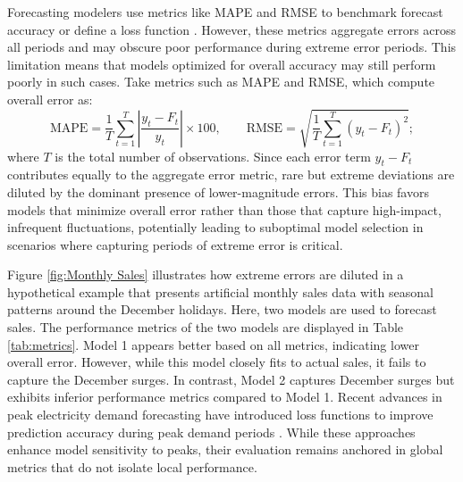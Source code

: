 \documentclass[12pt]{article}
\begin{document}
Forecasting modelers use metrics like MAPE and RMSE to benchmark forecast accuracy or define a loss function \citep{petropoulos2022}. However, these metrics aggregate errors across all periods and may obscure poor performance during extreme error periods. This limitation means that models optimized for overall accuracy may still perform poorly in such cases. Take metrics such as MAPE and RMSE, which compute overall error as:
\begin{equation}
\text{MAPE} = \frac{1}{T} \sum_{t=1}^{T} \left| \frac{y_t - F_t}{y_t} \right| \times 100,
\qquad
\text{RMSE} = \sqrt{\frac{1}{T} \sum_{t=1}^{T} (y_t - F_t)^2};
\end{equation}
where $T$ is the total number of observations. Since each error term $y_t - F_t$ contributes equally to the aggregate error metric, rare but extreme deviations are diluted by the dominant presence of lower-magnitude errors. This bias favors models that minimize overall error rather than those that capture high-impact, infrequent fluctuations, potentially leading to suboptimal model selection in scenarios where capturing periods of extreme error is critical.

Figure \ref{fig:Monthly Sales} illustrates how extreme errors are diluted in a hypothetical example that presents artificial monthly sales data with seasonal patterns around the December holidays. Here, two models are used to forecast sales. The performance metrics of the two models are displayed in Table \ref{tab:metrics}. Model 1 appears better based on all metrics, indicating lower overall error. However, while this model closely fits to actual sales, it fails to capture the December surges. In contrast, Model 2 captures  December surges but exhibits inferior performance metrics compared to Model 1.  Recent advances in peak electricity demand forecasting have introduced loss functions to improve prediction accuracy during peak demand periods \citep{nygard2025}. While these approaches enhance model sensitivity to peaks, their evaluation remains anchored in global metrics that do not isolate local performance. %
\end{document}
